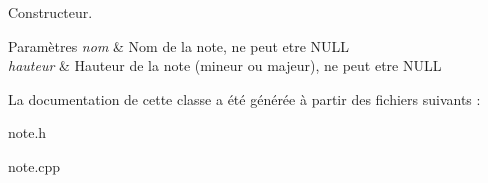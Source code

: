 Constructeur. 


\begin{DoxyParams}{Paramètres}
{\em nom} & Nom de la note, ne peut etre N\-U\-L\-L \\
\hline
{\em hauteur} & Hauteur de la note (mineur ou majeur), ne peut etre N\-U\-L\-L \\
\hline
\end{DoxyParams}


La documentation de cette classe a été générée à partir des fichiers suivants \-:\begin{DoxyCompactItemize}
\item 
note.\-h\item 
note.\-cpp\end{DoxyCompactItemize}
